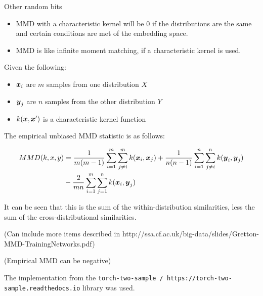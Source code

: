 Other random bits

\begin{itemize}
    \item MMD with a characteristic kernel will be 0 if the distributions are the same and certain conditions are met of the embedding space. 
    \item MMD is like infinite moment matching, if a characteristic kernel is used. 
\end{itemize} 

Given the following:

\begin{itemize}
    \item $\boldsymbol{x}_i$ are $m$ samples from one distribution  $X$
    \item $\boldsymbol{y}_j$ are $n$ samples from the other distribution $Y$
    \item $k(\boldsymbol{x}, \boldsymbol{x}')$ is a characteristic kernel function
\end{itemize}

The empirical unbiased MMD statistic is as follows:

\begin{equation}
\label{eq:mmd}
\begin{split}
MMD (k, x, y) &= \frac{1}{m(m-1)} \sum_{i=1}^m \sum_{j \neq i}^m k(\boldsymbol{x}_i, \boldsymbol{x}_j) + \frac{1}{n(n-1)} \sum_{i=1}^n \sum_{j \neq i}^n k(\boldsymbol{y}_i, \boldsymbol{y}_j) \\
&- \frac{2}{mn} \sum_{i=1}^m \sum_{j=1}^n k(\boldsymbol{x}_i, \boldsymbol{y}_j)
\end{split}
\end{equation}

It can be seen that this is the sum of the within-distribution similarities, less the sum of the cross-distributional similarities. 

(Can include more items described in http://ssa.cf.ac.uk/big-data/slides/Gretton-MMD-TrainingNetworks.pdf)

(Empirical MMD can be negative)

The implementation from the \texttt{torch-two-sample / https://torch-two-sample.readthedocs.io} library \cite{torchtwosample} was used.  


